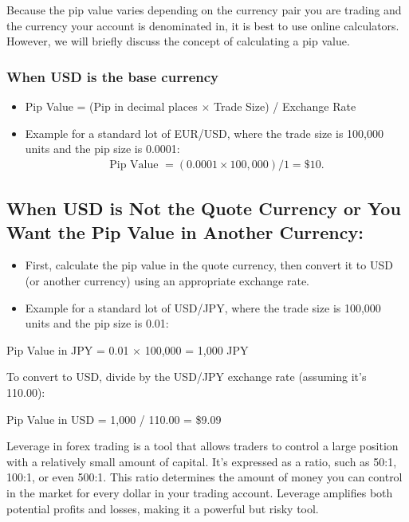 \documentclass{report}
\begin{document}
     \bigbreak \noindent 
     Because the pip value varies depending on the currency pair you are trading and the currency your account is denominated in, it is best to use online calculators. However, we will briefly discuss the concept of calculating a pip value.
     \bigbreak \noindent 
     \subsubsection{When USD is the base currency}
     \bigbreak \noindent 
     \begin{itemize}
         \item Pip Value = (Pip in decimal places $\times$ Trade Size) / Exchange Rate
         \item Example for a standard lot of EUR/USD, where the trade size is 100,000 units and the pip size is 0.0001:
             \begin{align*}
                 \text{Pip Value } = (0.0001 \times 100,000) / 1 = \$10
             .\end{align*}
     \end{itemize}
     \bigbreak \noindent 
     \subsection{When USD is Not the Quote Currency or You Want the Pip Value in Another Currency:}
     \begin{itemize}
         \item First, calculate the pip value in the quote currency, then convert it to USD (or another currency) using an appropriate exchange rate.
            \item Example for a standard lot of USD/JPY, where the trade size is 100,000 units and the pip size is 0.01:
        \end{itemize}
            \item Pip Value in JPY = 0.01 $\times$ 100,000 = 1,000 JPY
            \item To convert to USD, divide by the USD/JPY exchange rate (assuming it's 110.00):
            \item Pip Value in USD = 1,000 / 110.00 = \$9.09
        \begin{itemize}
     \end{itemize}

     \pagebreak 
     \bigbreak \noindent 
     Leverage in forex trading is a tool that allows traders to control a large position with a relatively small amount of capital. It's expressed as a ratio, such as 50:1, 100:1, or even 500:1. This ratio determines the amount of money you can control in the market for every dollar in your trading account. Leverage amplifies both potential profits and losses, making it a powerful but risky tool.
     \bigbreak \noindent 
\end{document}
